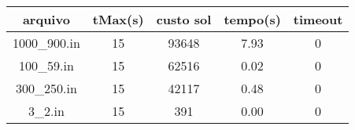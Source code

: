 \begin{table}[H]
\centering
\begin{tabular}{|c|c|c|c|c|}
\hline
arquivo & tMax(s) & custo sol & tempo(s) & timeout\\
\hline
1000\_900.in & 15 & 93648 & 7.93 & 0\\
\hline
100\_59.in & 15 & 62516 & 0.02 & 0\\
\hline
300\_250.in & 15 & 42117 & 0.48 & 0\\
\hline
3\_2.in & 15 & 391 & 0.00 & 0\\
\hline
\end{tabular}
\end{table}
